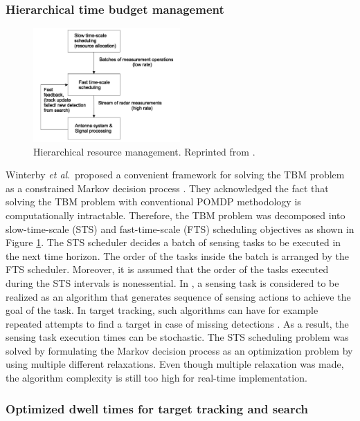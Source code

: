 \documentclass[english, 12pt, a4paper, elec, utf8, a-1b, online]{aaltothesis}
\newcommand{\etal}{\textit{et al}.~}
\begin{document}
\subsubsection{Hierarchical time budget management}

\begin{figure}[h]
    \centering
    \includegraphics[width=0.5\textwidth]{figures/two_time_scale.pdf}
    \caption{Hierarchical resource management. Reprinted from \cite{Wintenby2006}.}
    \label{fig:tts_schdeuling}
\end{figure}

Winterby \etal proposed a convenient framework for solving the TBM problem as a constrained Markov decision process \cite{Wintenby2006}.
They acknowledged the fact that solving the TBM problem with conventional POMDP methodology is computationally intractable.
Therefore, the TBM problem was decomposed into slow-time-scale (STS) and fast-time-scale (FTS) scheduling objectives as shown in Figure \ref{fig:tts_schdeuling}.
The STS scheduler decides a batch of sensing tasks to be executed in the next time horizon.
The order of the tasks inside the batch is arranged by the FTS scheduler.
Moreover, it is assumed that the order of the tasks executed during the STS intervals is nonessential.
In \cite{Wintenby2006}, a sensing task is considered to be realized as an algorithm that generates sequence of sensing actions to achieve the goal of the task.
In target tracking, such algorithms can have for example repeated attempts to find a target in case of missing detections \cite{Wintenby2006}.
As a result, the sensing task execution times can be stochastic.
The STS scheduling problem was solved by formulating the Markov decision process as an optimization problem by using multiple different relaxations.
Even though multiple relaxation was made, the algorithm complexity is still too high for real-time implementation.


\subsubsection{Optimized dwell times for target tracking and search}
\end{document}
